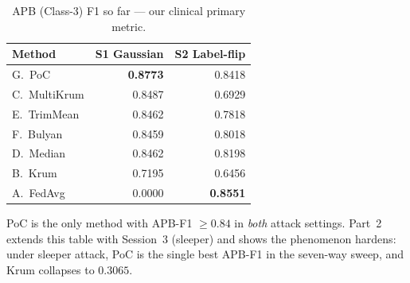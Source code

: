\documentclass[11pt,a4paper]{article}
\begin{document}
\begin{table}[H]
\centering
\caption{APB (Class-3) F1 so far --- our clinical primary metric.}
\label{tab:apb_so_far}
\begin{tabular}{@{}lrr@{}}
\toprule
\textbf{Method} & \textbf{S1 Gaussian} & \textbf{S2 Label-flip} \\
\midrule
G.\ PoC       & \textbf{0.8773} & 0.8418 \\
C.\ MultiKrum & 0.8487          & 0.6929 \\
E.\ TrimMean  & 0.8462          & 0.7818 \\
F.\ Bulyan    & 0.8459          & 0.8018 \\
D.\ Median    & 0.8462          & 0.8198 \\
B.\ Krum      & 0.7195          & 0.6456 \\
A.\ FedAvg    & \rowcolor{softred}0.0000 & \textbf{0.8551} \\
\bottomrule
\end{tabular}
\end{table}

PoC is the only method with APB-F1 $\geq 0.84$ in \textit{both} attack
settings. Part~2 extends this table with Session~3 (sleeper) and shows
the phenomenon hardens: under sleeper attack, PoC is the single best
APB-F1 in the seven-way sweep, and Krum collapses to $0.3065$.

\end{document}
